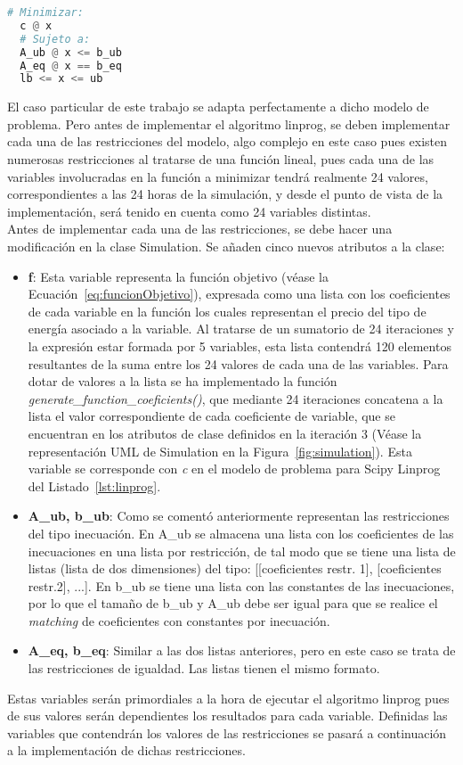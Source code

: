 \begin{lstlisting}[language=Python,float=ht,numbers=none,caption={Tipo de problema aplicable a Scipy.optimize.linprog},label={lst:linprog}]
  # Minimizar:
  c @ x
  # Sujeto a:
  A_ub @ x <= b_ub
  A_eq @ x == b_eq
  lb <= x <= ub
\end{lstlisting}
El caso particular de este trabajo se adapta perfectamente a dicho modelo de problema. Pero antes de implementar el algoritmo linprog, se deben implementar cada una de las restricciones del modelo, algo complejo en este caso pues existen numerosas restricciones al tratarse de una función lineal, pues cada una de las variables involucradas en la función a minimizar tendrá realmente 24 valores, correspondientes a las 24 horas de la simulación, y desde el punto de vista de la implementación, será tenido en cuenta como 24 variables distintas.\\

Antes de implementar cada una de las restricciones, se debe hacer una modificación en la clase Simulation. Se añaden cinco nuevos atributos a la clase:
\begin{itemize}
\item \textbf{f}: Esta variable representa la función objetivo (véase la Ecuación~\ref{eq:funcionObjetivo}), expresada como una lista con los coeficientes de cada variable en la función los cuales representan el precio del tipo de energía asociado a la variable. Al tratarse de un sumatorio de 24 iteraciones y la expresión estar formada por 5 variables, esta lista contendrá 120 elementos resultantes de la suma entre los 24 valores de cada una de las variables. Para dotar de valores a la lista se ha implementado la función \textit{generate\_function\_coeficients()}, que mediante 24 iteraciones concatena a la lista el valor correspondiente de cada coeficiente de variable, que se encuentran en los atributos de clase definidos en la iteración 3 (Véase la representación UML de Simulation en la Figura~\ref{fig:simulation}). Esta variable se corresponde con \textit{c} en el modelo de problema para Scipy Linprog del Listado~\ref{lst:linprog}.
\item \textbf{A\_ub, b\_ub}: Como se comentó anteriormente representan las restricciones del tipo inecuación. En A\_ub se almacena una lista con los coeficientes de las inecuaciones en una lista por restricción, de tal modo que se tiene una lista de listas (lista de dos dimensiones) del tipo: [[coeficientes restr. 1], [coeficientes restr.2], ...]. En b\_ub se tiene una lista con las constantes de las inecuaciones, por lo que el tamaño de b\_ub y A\_ub debe ser igual para que se realice el \textit{matching} de coeficientes con constantes por inecuación.
\item \textbf{A\_eq, b\_eq}: Similar a las dos listas anteriores, pero en este caso se trata de las restricciones de igualdad. Las listas tienen el mismo formato.
\end{itemize}
Estas variables serán primordiales a la hora de ejecutar el algoritmo linprog pues de sus valores serán dependientes los resultados para cada variable. Definidas las variables que contendrán los valores de las restricciones se pasará a continuación a la implementación de dichas restricciones.
